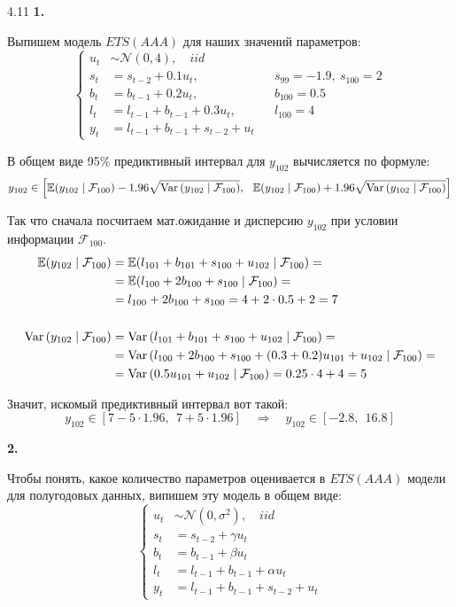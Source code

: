 \begin{solution}{{4.11}}
\textbf{1.}

Выпишем модель $ETS(AAA)$ для наших значений параметров:
\[
    \left\{\begin{aligned}
        u_t &\sim \mathcal{N}(0, 4), \quad iid \\
        s_t &= s_{t-2} + 0.1 u_t, && s_{99} = -1.9, \ s_{100} = 2\\
        b_t &= b_{t-1} + 0.2 u_t, && b_{100} = 0.5\\
        l_t &= l_{t-1} + b_{t-1} + 0.3 u_t, && l_{100} = 4 \\
        y_t &= l_{t-1} + b_{t-1} + s_{t-2} + u_t
    \end{aligned}\right.
\]

В общем виде 95\% предиктивный интервал для $y_{102}$ вычисляется по формуле:
\[
    y_{102} \in \left[\mathbb{E}{\left(y_{102} \mid \mathcal{F}_{100}\right)} - 1.96 \sqrt{\operatorname{Var}{\left(y_{102} \mid \mathcal{F}_{100}\right)}},\ \  \mathbb{E}{\left(y_{102} \mid \mathcal{F}_{100}\right)} + 1.96 \sqrt{\operatorname{Var}{\left(y_{102} \mid \mathcal{F}_{100}\right)}}\right]
\]

Так что сначала посчитаем мат.ожидание и дисперсию $y_{102}$ при условии информации $\mathcal{F}_{100}$.
\begin{align*}
    \mathbb{E}{\left(y_{102} \mid \mathcal{F}_{100}\right)} &= \mathbb{E}{\left(l_{101} + b_{101} + s_{100} + u_{102} \mid \mathcal{F}_{100}\right)} = \\
    &= \mathbb{E}{\left(l_{100} + 2b_{100} + s_{100} \mid \mathcal{F}_{100}\right)} = \\
    &= l_{100} + 2b_{100} + s_{100} = 4 + 2 \cdot 0.5 + 2 = 7 \\ \\
    \operatorname{Var}{\left(y_{102} \mid \mathcal{F}_{100}\right)} &= \operatorname{Var}{\left(l_{101} + b_{101} + s_{100} + u_{102} \mid \mathcal{F}_{100}\right)} = \\
    &= \operatorname{Var}{\left(l_{100} + 2b_{100} + s_{100} + (0.3 + 0.2) u_{101} + u_{102} \mid \mathcal{F}_{100}\right)} = \\
    &= \operatorname{Var}{\left(0.5 u_{101} + u_{102} \mid \mathcal{F}_{100}\right)} = 0.25 \cdot 4 + 4 = 5
\end{align*}

Значит, искомый предиктивный интервал вот такой:
\[
    y_{102} \in \left[7 - 5 \cdot 1.96, \ \ 7 + 5 \cdot 1.96\right] \quad \Rightarrow \quad y_{102} \in \left[-2.8, \ \ 16.8\right]
\]

\textbf{2.}

Чтобы понять, какое количество параметров оценивается в $ETS(AAA)$ модели для полугодовых данных, випишем эту модель в общем виде:
\[
    \left\{\begin{aligned}
        u_t &\sim \mathcal{N}(0, \sigma^2), \quad iid \\
        s_t &= s_{t-2} + \gamma u_t \\
        b_t &= b_{t-1} + \beta u_t \\
        l_t &= l_{t-1} + b_{t-1} + \alpha u_t \\
        y_t &= l_{t-1} + b_{t-1} + s_{t-2} + u_t
    \end{aligned}\right.
\]


\end{solution}

